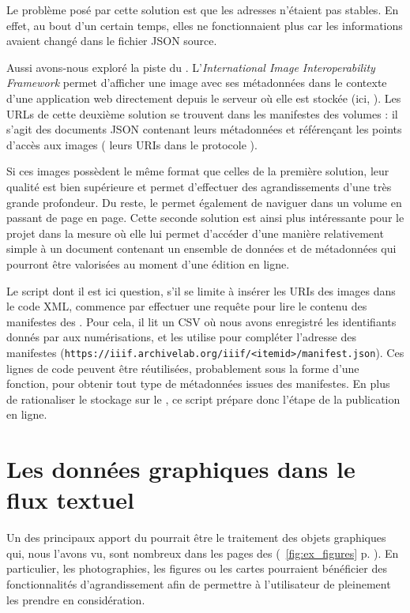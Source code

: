 Le problème posé par cette solution est que les adresses n'étaient pas stables. En effet, au bout d'un certain temps, elles ne fonctionnaient plus car les informations avaient changé dans le fichier JSON source.

Aussi avons-nous exploré la piste du \iiif. L'\textit{International Image Interoperability Framework} permet d'afficher une image avec ses métadonnées dans le contexte d'une application web directement depuis le serveur où elle est stockée (ici, \ia). Les URLs de cette deuxième solution se trouvent dans les \og manifestes \iiif{} \fg{} des volumes : il s'agit des documents JSON contenant leurs métadonnées et référençant les points d'accès aux images (\cad{} leurs URIs dans le protocole \iiif).

Si ces images possèdent le même format que celles de la première solution, leur qualité est bien supérieure et permet d'effectuer des agrandissements d'une très grande profondeur. Du reste, le \iiif{} permet également de naviguer dans un volume en passant de page en page. Cette seconde solution est ainsi plus intéressante pour le projet \timeus{} dans la mesure où elle lui permet d'accéder d'une manière relativement simple à un document contenant un ensemble de données et de métadonnées qui pourront être valorisées au moment d'une édition en ligne.

Le script dont il est ici question, s'il se limite à insérer les URIs des images dans le code XML, commence par effectuer une requête pour lire le contenu des manifestes \iiif{} des \odm{}. Pour cela, il lit un CSV où nous avons enregistré les identifiants donnés par \ia{} aux numérisations, et les utilise pour compléter l'adresse des manifestes (\texttt{https://iiif.archivelab.org/iiif/<itemid>/manifest.json}). Ces lignes de code peuvent être réutilisées, probablement sous la forme d'une fonction, pour obtenir tout type de métadonnées issues des manifestes. En plus de rationaliser le stockage sur le \sharedocs{}, ce script prépare donc l'étape de la publication en ligne.

\section{Les données graphiques dans le flux textuel}

Un des principaux apport du \iiif{} pourrait être le traitement des objets graphiques qui, nous l'avons vu, sont nombreux dans les pages des \odm{} (\fig{}~\ref{fig:ex_figures} p. \pageref{fig:ex_figures}). En particulier, les photographies, les figures ou les cartes pourraient bénéficier des fonctionnalités d'agrandissement afin de permettre à l'utilisateur de pleinement les prendre en considération.

